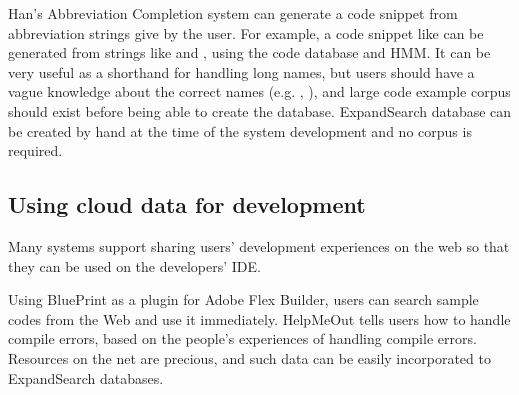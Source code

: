 \documentclass[manuscript,screen,review]{acmart}
\def\ES{\textsf{ExpandSearch}}
\begin{document}
Han's Abbreviation Completion system\cite{Han:2009:CCA:1747491.1747530}
can generate a code snippet from abbreviation strings give by the user.
For example, a code snippet like 
can be generated from strings like
 and , using the code database and HMM.
It can be very useful as a shorthand for handling long names,
but users should have a vague knowledge about the correct names
(e.g. , ),
and large code example corpus should exist before being able to
create the database.
{\ES} database can be created by hand at the time of the system development
and no corpus is required.


\subsection{Using cloud data for development}


Many systems support sharing users' development experiences on the web so that
they can be used on the developers' IDE.

Using BluePrint\cite{Brandt:2010:EPI:1753326.1753402}
as a plugin for Adobe Flex Builder,
users can search sample codes from the Web and use it immediately.
%
HelpMeOut\cite{Hartmann:2010:OPS:1753326.1753478} tells users
how to handle compile errors,
based on the people's experiences of handling compile errors.
%
Resources on the net are precious, and such data can be
easily incorporated to {\ES} databases.


% 
% 
% 
\end{document}
